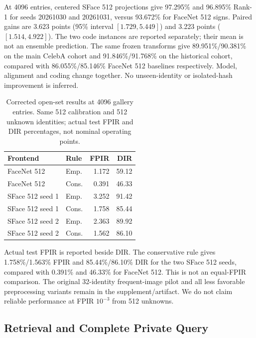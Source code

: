 At 4096 entries, centered SFace 512 projections give 97.295\% and 96.895\% Rank-1 for seeds 20261030 and 20261031, versus 93.672\% for FaceNet 512 signs. Paired gains are 3.623 points (95\% interval $[1.729,5.449]$) and 3.223 points ($[1.514,4.922]$). The two code instances are reported separately; their mean is not an ensemble prediction. The same frozen transforms give 89.951\%/90.381\% on the main CelebA cohort and 91.846\%/91.768\% on the historical cohort, compared with 86.055\%/85.146\% FaceNet 512 baselines respectively. Model, alignment and coding change together. No unseen-identity or isolated-hash improvement is inferred.

\begin{table}[t]
\caption{Corrected open-set results at 4096 gallery entries. Same 512 calibration and 512 unknown identities; actual test FPIR and DIR percentages, not nominal operating points.}
\label{tab:v3open}\centering\small
\setlength{\tabcolsep}{3pt}
\begin{tabular}{llrr}
\toprule
Frontend & Rule & FPIR & DIR \\
\midrule
FaceNet 512 & Emp. & 1.172 & 59.12 \\
FaceNet 512 & Cons. & 0.391 & 46.33 \\
SFace 512 seed 1 & Emp. & 3.252 & 91.42 \\
SFace 512 seed 1 & Cons. & 1.758 & 85.44 \\
SFace 512 seed 2 & Emp. & 2.363 & 89.92 \\
SFace 512 seed 2 & Cons. & 1.562 & 86.10 \\
\bottomrule
\end{tabular}
\end{table}

Actual test FPIR is reported beside DIR. The conservative rule gives 1.758\%/1.563\% FPIR and 85.44\%/86.10\% DIR for the two SFace 512 seeds, compared with 0.391\% and 46.33\% for FaceNet 512. This is not an equal-FPIR comparison. The original 32-identity frequent-image pilot and all less favorable preprocessing variants remain in the supplement/artifact. We do not claim reliable performance at FPIR $10^{-3}$ from 512 unknowns.

\subsection{Retrieval and Complete Private Query}

